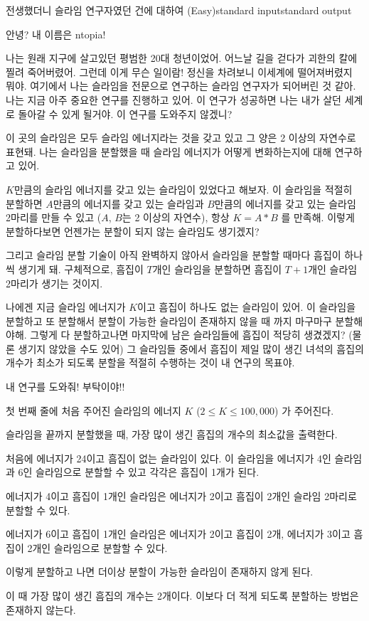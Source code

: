 \begin{problem}{전생했더니 슬라임 연구자였던 건에 대하여 (Easy)}{standard input}{standard output}

안녕? 내 이름은 ntopia!

나는 원래 지구에 살고있던 평범한 20대 청년이었어. 어느날 길을 걷다가 괴한의 칼에 찔려
죽어버렸어. 그런데 이게 무슨 일이람! 정신을 차려보니 이세계에 떨어져버렸지 뭐야.
여기에서 나는 슬라임을 전문으로 연구하는 슬라임 연구자가 되어버린 것 같아.
나는 지금 아주 중요한 연구를 진행하고 있어. 이 연구가 성공하면 나는 내가 살던 세계로
돌아갈 수 있게 될거야. 이 연구를 도와주지 않겠니?

이 곳의 슬라임은 모두 슬라임 에너지라는 것을 갖고 있고 그 양은 2 이상의 자연수로 표현돼.
나는 슬라임을 분할했을 때 슬라임 에너지가 어떻게 변화하는지에 대해 연구하고 있어.

$K$만큼의 슬라임 에너지를 갖고 있는 슬라임이 있었다고 해보자. 이 슬라임을 적절히 분할하면
$A$만큼의 에너지를 갖고 있는 슬라임과
$B$만큼의 에너지를 갖고 있는 슬라임 2마리를 만들 수 있고 ($A$, $B$는 2 이상의 자연수),
항상 $K = A * B$ 를 만족해.
이렇게 분할하다보면 언젠가는 분할이 되지 않는 슬라임도 생기겠지?

그리고 슬라임 분할 기술이 아직 완벽하지 않아서 슬라임을 분할할 때마다
흠집이 하나씩 생기게 돼. 구체적으로, 흠집이 $T$개인 슬라임을 분할하면
흠집이 $T+1$개인 슬라임 2마리가 생기는 것이지.

나에겐 지금 슬라임 에너지가 $K$이고 흠집이 하나도 없는 슬라임이 있어.
이 슬라임을 분할하고 또 분할해서 분할이 가능한 슬라임이 존재하지 않을 때 까지 마구마구 분할해야해.
그렇게 다 분할하고나면 마지막에 남은 슬라임들에 흠집이 적당히 생겼겠지?
(물론 생기지 않았을 수도 있어)
그 슬라임들 중에서 흠집이 제일 많이 생긴 녀석의 흠집의 개수가 최소가 되도록
분할을 적절히 수행하는 것이 내 연구의 목표야.

내 연구를 도와줘! 부탁이야!!

\InputFile
첫 번째 줄에 처음 주어진 슬라임의 에너지 $K$ ($2 \le K \le 100,000$) 가 주어진다.

\OutputFile
슬라임을 끝까지 분할했을 때, 가장 많이 생긴 흠집의 개수의 최소값을 출력한다.

\Example

\begin{example}
%
%
%
\end{example}

\Notes
처음에 에너지가 24이고 흠집이 없는 슬라임이 있다.
이 슬라임을 에너지가 4인 슬라임과 6인 슬라임으로 분할할 수 있고 각각은 흠집이 1개가 된다.

에너지가 4이고 흠집이 1개인 슬라임은 에너지가 2이고 흠집이 2개인 슬라임 2마리로 분할할 수 있다.

에너지가 6이고 흠집이 1개인 슬라임은 에너지가 2이고 흠집이 2개, 에너지가 3이고 흠집이 2개인 슬라임으로 분할할 수 있다.

이렇게 분할하고 나면 더이상 분할이 가능한 슬라임이 존재하지 않게 된다.

이 때 가장 많이 생긴 흠집의 개수는 2개이다. 이보다 더 적게 되도록 분할하는 방법은 존재하지 않는다.

\end{problem}
